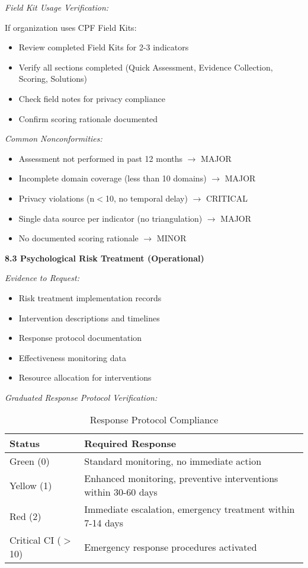 \documentclass[11pt,a4paper]{article}
\begin{document}
\textit{Field Kit Usage Verification:}

If organization uses CPF Field Kits:
\begin{itemize}
\item Review completed Field Kits for 2-3 indicators
\item Verify all sections completed (Quick Assessment, Evidence Collection, Scoring, Solutions)
\item Check field notes for privacy compliance
\item Confirm scoring rationale documented
\end{itemize}

\textit{Common Nonconformities:}
\begin{itemize}
\item Assessment not performed in past 12 months $\rightarrow$ MAJOR
\item Incomplete domain coverage (less than 10 domains) $\rightarrow$ MAJOR
\item Privacy violations (n$<$10, no temporal delay) $\rightarrow$ CRITICAL
\item Single data source per indicator (no triangulation) $\rightarrow$ MAJOR
\item No documented scoring rationale $\rightarrow$ MINOR
\end{itemize}

\textbf{8.3 Psychological Risk Treatment (Operational)}

\textit{Evidence to Request:}
\begin{itemize}
\item Risk treatment implementation records
\item Intervention descriptions and timelines
\item Response protocol documentation
\item Effectiveness monitoring data
\item Resource allocation for interventions
\end{itemize}

\textit{Graduated Response Protocol Verification:}

\begin{table}[h]
\centering
\caption{Response Protocol Compliance}
\small
\begin{tabular}{lp{8cm}}
\toprule
\textbf{Status} & \textbf{Required Response} \\
\midrule
Green (0) & Standard monitoring, no immediate action \\
Yellow (1) & Enhanced monitoring, preventive interventions within 30-60 days \\
Red (2) & Immediate escalation, emergency treatment within 7-14 days \\
Critical CI ($>$10) & Emergency response procedures activated \\
\bottomrule
\end{tabular}
\end{table}
\end{document}
